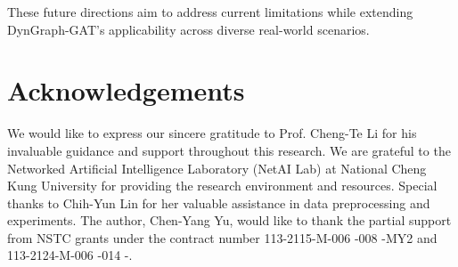 \documentclass[conference]{IEEEtran}
\begin{document}
These future directions aim to address current limitations while extending DynGraph-GAT's applicability across diverse real-world scenarios.


\section*{Acknowledgements}
We would like to express our sincere gratitude to Prof. Cheng-Te Li for his invaluable guidance and support throughout this research. We are grateful to the Networked Artificial Intelligence Laboratory (NetAI Lab) at National Cheng Kung University for providing the research environment and resources. Special thanks to Chih-Yun Lin for her valuable assistance in data preprocessing and experiments. The author, Chen-Yang Yu, would like to thank the partial support from NSTC grants under the contract number 113-2115-M-006 -008 -MY2 and 113-2124-M-006 -014 -.



\end{document}
